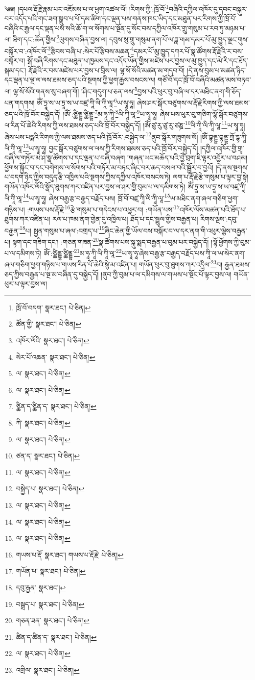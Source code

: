 \setcounter{footnote}{0} 
༄༅། །དཔལ་རྡོ་རྗེ་རྣམ་པར་འཇོམས་པ་ལ་ཕྱག་འཚལ་ལོ། །རིགས་ཀྱི་:ཁྲོ་བོ་\footnote{ཁྲོ་བོ་བདག་  སྣར་ཐང་།  པེ་ཅིན། }བཞིའི་དཀྱིལ་འཁོར་དུ་དབང་བསྐུར་བར་འདོད་པའི་གང་ཟག་སྒྲུབ་པ་པོ་དམ་ཚིག་དང་ལྡན་པས་གནས་ཁང་ཡིད་དང་མཐུན་པར་རིགས་ཀྱི་ཁྲོ་བོ་བཞིའི་ང་རྒྱལ་དང་ལྡན་པས་སའི་ཆོ་ག་ལ་སོགས་པ་སྔོན་དུ་སོང་བས་དཀྱིལ་འཁོར་གྲུ་གསུམ་པ་རབ་ཏུ་མཉམ་པ་ལ། ཐིག་དང་:ཚོན་གྱིས་\footnote{ཚོན་གྱི་  སྣར་ཐང་།  པེ་ཅིན། }ལུགས་བཞིན་བྱས་ལ། དབུས་སུ་གྲུ་གསུམ་ནག་པོ་ལ་ཟླ་གམ་དམར་པོ་མུ་ཁྱུད་ལྗང་གུས་བསྐོར་བ་:འཁོར་ལོ་\footnote{འཁོར་ལོའི་  སྣར་ཐང་།  པེ་ཅིན། }རྩིབས་བཞི་པ་:སེར་པོ་རྩིབས་མཆན་\footnote{སེར་པོ་འཆན་  སྣར་ཐང་།  པེ་ཅིན། }དམར་པོ་མུ་ཁྱུད་དཀར་པོ་སྣ་ཚོགས་རྡོ་རྗེའི་ར་བས་བསྐོར་བ། སྒོ་བཞི་རིགས་དང་མཐུན་པ་ཁྱམས་དང་འདོད་ཡོན་གྱིས་མཛེས་པར་བྱས་ལ་མུ་ཁྱུད་དང་མེ་རི་དང་ཐོད་སྐམ་དང་། རྡོ་རྗེའི་ར་བས་མཛེས་པར་བྱས་པ་བྲིས་ལ། ལྷ་སོ་སོའི་མཚན་མ་གདབ་བོ། །དེ་ནས་བུམ་པ་མཚན་ཉིད་དང་ལྡན་པ་ལྔ་ལ་ལས་ཐམས་ཅད་པའི་སྔགས་ཀྱི་ཕྱག་རྒྱས་བསངས་ལ། གཙོ་བོ་དང་ཁྲོ་བོ་བཞིའི་མཚན་མས་བཏབ་ལ། ལྷ་སོ་སོའི་གནས་སུ་བཞག་གོ། །ཤིང་གདུག་པ་ཅན་ལས་\footnote{ལ་  སྣར་ཐང་།  པེ་ཅིན། }བྱས་པའི་ཕུར་བུ་བཞི་ལ་དར་མཐིང་ནག་གི་ཅོད་པན་གདགས། ཨོཾ་ཏྲཱ་ས་ཡ་ཏྲཱ་ས་ཡ་བཛྲ་ཀཱི་ལི་ཀཱི་ལཱ་\footnote{ལ་  སྣར་ཐང་།  པེ་ཅིན། }ཡ་སྭཱ་ཧཱ། ཞེས་ཤར་སྒོར་བཙུགས་ལ་རྡོ་རྗེ་རིགས་ཀྱི་ལས་ཐམས་ཅད་པའི་ཁྲོ་བོར་བསྐྱེད་དོ། །ཨོཾ་:ཙྪིནྡྷ་ཙྪིནྡྷ་\footnote{ཙྪིན་ད་ཙྪིན་ད་  སྣར་ཐང་།  པེ་ཅིན། }མ་ཧཱ་ཀཱི་\footnote{ཀི་  སྣར་ཐང་།  པེ་ཅིན། }ལི་ཀཱི་ལཱ་\footnote{ལ་  སྣར་ཐང་།  པེ་ཅིན། }ཡ་སྭཱ་ཧཱ། ཞེས་པས་ཕུར་བུ་གཅིག་ལྷོ་སྒོར་བཙུགས་ལ་རིན་པོ་ཆེའི་རིགས་ཀྱི་ལས་ཐམས་ཅད་པའི་ཁྲོ་བོར་བསྐྱེད་དོ། །ཨོཾ་ཙུ་རུ་ཙུ་རུ་ཙཎྜ་\footnote{ཙན་ད་  སྣར་ཐང་།  པེ་ཅིན། }ལི་ཀཱི་ལི་ཀཱི་ལཱ་\footnote{ལ་  སྣར་ཐང་།  པེ་ཅིན། }ཡ་སྭཱ་ཧཱ། ཞེས་པས་པདྨའི་རིགས་ཀྱི་ལས་ཐམས་ཅད་པའི་ཁྲོ་བོར་:བསྐྱེད་ལ་\footnote{བསྐྱེད་པ་  སྣར་ཐང་།  པེ་ཅིན། }ནུབ་སྒོར་གཟུགས་སོ། །ཨོཾ་བྷནྡྷ་བྷནྡྷ་ཀྲོ་དྷ་ཀཱི་ལི་ཀཱི་ལཱ་\footnote{ལ་  སྣར་ཐང་།  པེ་ཅིན། }ཡ་སྭཱ་ཧཱ། བྱང་སྒོར་བཙུགས་ལ་ལས་ཀྱི་རིགས་ཐམས་ཅད་པའི་ཁྲོ་བོར་བསྐྱེད་དོ། །དཀྱིལ་འཁོར་གྱི་གྲྭ་བཞི་ལ་གཏོར་མ་ཤ་སྣ་ཚོགས་པ་དང་ལྡན་པ་བཞི་བཞག །གཞན་ཡང་མཆོད་པའི་བྱེ་བྲག་ཇི་ལྟར་འབྱོར་པ་བཤམ། ཕྱོགས་སྐྱོང་བ་དང་བགེགས་ལ་སོགས་པའི་གཏོར་མ་བཏང་ཞིང་བར་ཆད་བསལ་བའི་སྦྱོར་བ་བྱའོ། །དེ་ནས་སྔགས་པ་བདག་ཉིད་ཀྱིས་བདུད་རྩི་འཁྱིལ་པའི་སྔགས་ཀྱིས་དཀྱིལ་འཁོར་བསངས་ཏེ། ལག་པ་རྡོ་རྗེ་རྩེ་གསུམ་པ་ལྟར་བྱ་སྟེ། གཡོན་འཁོར་ལོའི་སྣོད་ཐུགས་ཀར་འཛིན་པར་བྱས་ལ་ཤར་གྱི་བུམ་པ་ལ་དམིགས་ཏེ། ཨོཾ་ཏྲཱ་ས་ཡ་ཏྲཱ་ས་ཡ་བཛྲ་ཀཱི་ལི་ཀཱི་ལཱ་\footnote{ལ་  སྣར་ཐང་།  པེ་ཅིན། }ཡ་སྭཱ་ཧཱ། ཞེས་བརྒྱ་རྩ་བརྒྱད་བརྗོད་པས། ཁྲོ་བོ་བཛྲ་ཀཱི་ལི་ཀཱི་ལཱ་\footnote{ལ་  སྣར་ཐང་།  པེ་ཅིན། }ཡ་མཐིང་ནག་ཞལ་གཅིག་ཕྱག་གཉིས་པ། :གཡས་པས་རྡོ་རྗེ་\footnote{གཡས་པ་རྡོ་  སྣར་ཐང་། གཡས་པ་རྡོ་རྗེ་  པེ་ཅིན། }རྩེ་གསུམ་པ་གདེངས་པ་འཕྱར་བ། :གཡོན་པས་\footnote{གཡོན་པ་  སྣར་ཐང་།  པེ་ཅིན། }འཁོར་ལོས་མཚན་པའི་ཐོད་པ་ཐུགས་ཀར་འཛིན་པ། རལ་པ་ཁམ་ནག་གྱེན་དུ་འཁྱིལ་པ། ཐོད་པ་དང་སྦྲུལ་གྱིས་བརྒྱན་པ། རིགས་ལྔས་:དབུ་བརྒྱན་\footnote{དབུ་རྒྱན་  སྣར་ཐང་། }པ། སྤྱན་གསུམ་པ་ཞལ་:བགྲད་པ་\footnote{བསྒྲད་པ་  སྣར་ཐང་།  པེ་ཅིན། }ཞིང་ཆེན་གྱི་ཡོལ་བས་བསྐོར་བ་ལ་དར་ནག་གི་འཕུར་ལྕེས་བརྒྱན་པ། སྟག་དང་གཟིག་དང་། :གཅན་གཟན་\footnote{གཅན་ཟན་  སྣར་ཐང་།  པེ་ཅིན། }སྣ་ཚོགས་པས་སྐུ་སྨད་བརྒྱན་པ་བུམ་པར་བསྐྱེད་དོ། །ལྷོ་ཕྱོགས་ཀྱི་བུམ་པ་ལ་དམིགས་ཏེ། ཨོཾ་:ཙྪིནྡྷ་ཙྪིནྡྷ་\footnote{ཚིན་ད་ཚིན་ད་  སྣར་ཐང་།  པེ་ཅིན། }མ་ཧཱ་ཀཱི་ལི་ཀཱི་ལཱ་\footnote{ལ་  སྣར་ཐང་།  པེ་ཅིན། }ཡ་སྭཱ་ཧཱ་ཞེས་བརྒྱ་རྩ་བརྒྱད་བརྗོད་པས་ཀཱི་ལ་ཡ་སེར་ནག་ཞལ་གཅིག་ཕྱག་གཉིས་པ་གཡས་རིན་པོ་ཆེའི་སྙེ་མ་འཛིན་པ། གཡོན་ཕུར་བུ་ཐུགས་ཀར་འདྲིལ་\footnote{འགྲིལ་  སྣར་ཐང་།  པེ་ཅིན། }བ། རྒྱན་ཐམས་ཅད་ཀྱིས་བརྒྱན་པ་སྔ་མ་བཞིན་དུ་བསྐྱེད་དོ། །ནུབ་ཀྱི་བུམ་པ་ལ་དམིགས་ལ་གཡས་པ་སྡོང་པོ་ལྟར་བྱས་ལ། གཡོན་ཕུར་པ་ལྟར་བྱས་ལ། 